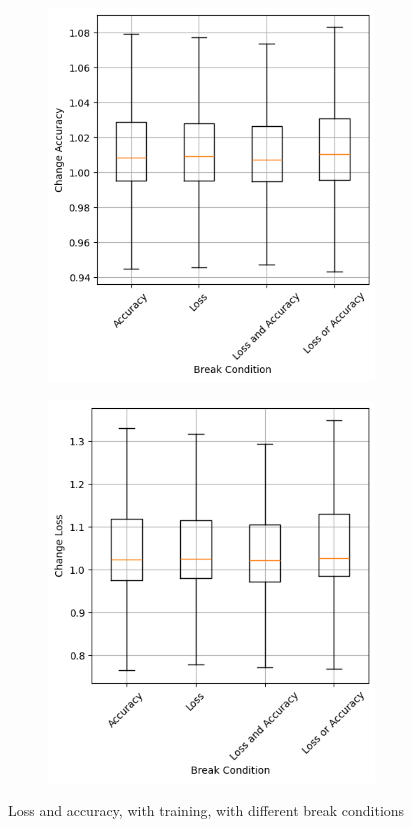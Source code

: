 \begin{figure}
    \begin{subfigure}{0.5\textwidth}
        \centering
        \includegraphics[width=0.95\textwidth]{plots/BreakCondition_Trained_accuracy.png}
    \end{subfigure}
    \begin{subfigure}{0.5\textwidth}
        \centering
        \includegraphics[width=0.95\textwidth]{plots/BreakCondition_Trained_loss.png}
    \end{subfigure}
    \caption{Loss and accuracy, with training, with different break conditions}
    \label{fig:break-conditions-training}
\end{figure}
